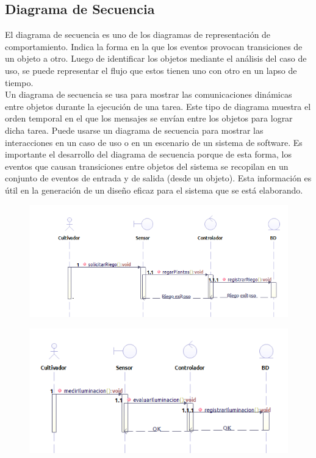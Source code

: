 \begin{table}[]
\newpage

\subsection{Diagrama de Secuencia}
El diagrama de secuencia es uno de los diagramas de representación de comportamiento. Indica la forma en la que los eventos provocan transiciones de un objeto a otro. Luego de identificar los objetos mediante el análisis del caso de uso, se puede representar el flujo que estos tienen uno con otro en un lapso de tiempo.\\

Un diagrama de secuencia se usa para mostrar las comunicaciones dinámicas entre objetos durante la ejecución de una tarea. Este tipo de diagrama muestra el orden temporal en el que los mensajes se envían entre los objetos para lograr dicha tarea. Puede usarse un diagrama de secuencia para mostrar las interacciones en un caso de uso o en un escenario de un sistema de software.
Es importante el desarrollo del diagrama de secuencia porque de esta forma, los eventos que causan transiciones entre objetos del sistema se recopilan en un conjunto de eventos de entrada y de salida (desde un objeto). Esta información es útil en la generación de un diseño eficaz para el sistema que se está elaborando. \cite{bruegge2002ingenieria}

\begin{figure}[h!]
	\centering
	\includegraphics[width=1.2\linewidth]{proyecto/imgs/SecuenciaRiego}
	\caption{}
	\label{fig:secuenciariego}
\end{figure}

\begin{figure}[h!]
	\centering
	\includegraphics[width=1\linewidth]{proyecto/imgs/SecuenciaIluminacion}
	\caption{}
	\label{fig:secuenciailuminacion}
\end{figure}


\end{table}
